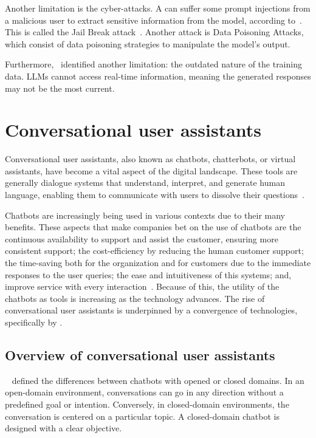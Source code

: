 Another limitation is the cyber-attacks. A {\llm} can suffer some prompt injections from a malicious user to extract sensitive information from the model, according to~\citet{kshetri_cybercrime_2023}. This is called the Jail Break attack~\cite{hadi_LLM_2023}. Another attack is Data Poisoning Attacks, which consist of data poisoning strategies to manipulate the model's output.

Furthermore,~\citet{liu_prompting_nodate}  identified another limitation: the outdated nature of the training data. LLMs cannot access real-time information, meaning the generated responses may not be the most current.



\section{Conversational user assistants}

Conversational user assistants, also known as chatbots, chatterbots, or virtual assistants, have become a vital aspect of the digital landscape. These tools are generally dialogue systems that understand, interpret, and generate human language, enabling them to communicate with users to dissolve their questions~\cite{borah_survey_2019}.

Chatbots are increasingly being used in various contexts due to their many benefits. These aspects that make companies bet on the use of chatbots are the continuous availability to support and assist the customer, ensuring more consistent support; the cost-efficiency by reducing the human customer support; the time-saving both for the organization and for customers due to the immediate responses to the user queries; the ease and intuitiveness of this systems; and, improve service with every interaction~\cite{misischia_chatbots_2022}. Because of this, the utility of the chatbots as tools is increasing as the technology advances. The rise of conversational user assistants is underpinned by a convergence of technologies, specifically by {\llm}.


\subsection{Overview of conversational user assistants}

~\citet{nuruzzaman_survey_2018} defined the differences between chatbots with opened or closed domains. In an open-domain environment, conversations can go in any direction without a predefined goal or intention. Conversely, in closed-domain environments, the conversation is centered on a particular topic. A closed-domain chatbot is designed with a clear objective.

